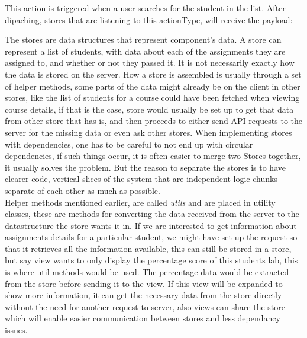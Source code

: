 This action is triggered when a user searches for the student in the list. After dipaching, stores that are listening to this actionType, will receive the payload:



The stores are data structures that represent component's data. A store can represent a list of students, with data about each of the assignments they are assigned to, and whether or not they passed it. It is not necessarily exactly how the data is stored on the server. How a store is assembled is usually through a set of helper methods, some parts of the data might already be on the client in other stores, like the list of students for a course could have been fetched when viewing course details, if that is the case, store would usually be set up to get that data from other store that has is, and then proceeds to either send API requests to the server for the missing data or even ask other stores. When implementing stores with dependencies, one has to be careful to not end up with circular dependencies, if such things occur, it is often easier to merge two Stores together, it usually solves the problem. But the reason to separate the stores is to have clearer code, vertical slices of the system that are independent logic chunks separate of each other as much as possible.
\\Helper methods mentioned earlier, are called \emph{utils} and are placed in utility classes, these are methods for converting the data received from the server to the datastructure the store wants it in. If we are interested to get information about assignments details for a particular student, we might have set up the request so that it retrieves all the information available, this can still be stored in a store, but say view wants to only display the percentage score of this students lab, this is where util methods would be used. The percentage data would be extracted from the store before sending it to the view. If this view will be expanded to show more information, it can get the necessary data from the store directly without the need for another request to server, also views can share the store which will enable easier communication between stores and less dependancy issues.
